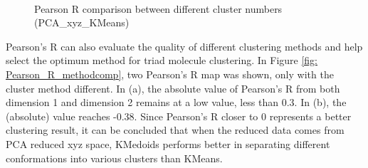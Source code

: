 \documentclass[a4paper]{article}
\begin{document}
\begin{figure}[H]
    \centering
     \\
    \caption{Pearson R comparison between different cluster numbers (PCA\_xyz\_KMeans)}
    \label{fig: Pearson_R_ncomp}
\end{figure}

Pearson's R can also evaluate the quality of different clustering methods and help select the optimum method for triad molecule clustering. In Figure \ref{fig: Pearson_R_methodcomp}, two Pearson's R map was shown, only with the cluster method different. In (a), the absolute value of Pearson's R from both dimension 1 and dimension 2 remains at a low value, less than 0.3. In (b), the (absolute) value reaches -0.38. Since Pearson's R closer to 0 represents a better clustering result, it can be concluded that when the reduced data comes from PCA reduced xyz space, KMedoids performs better in separating different conformations into various clusters than KMeans.
\end{document}
